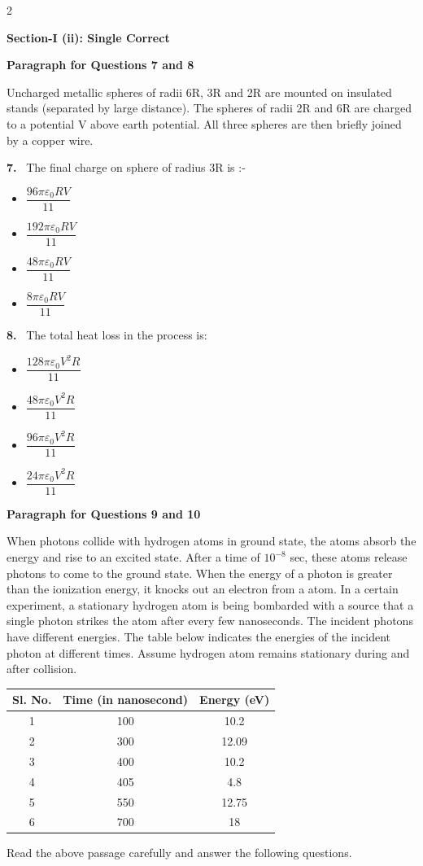 \documentclass[10pt]{extarticle}
\newcommand{\sect}[1]{\par\smallskip\noindent\textbf{#1}\par}
\newcommand{\qn}[1]{\par\smallskip\noindent\textbf{#1.}~}
\newcommand{\paraq}[2]{\par\smallskip\noindent\textbf{Paragraph for Questions #1 and #2}\par}
\newenvironment{qoptions}{\begin{itemize}[leftmargin=1.8em,itemsep=1pt,topsep=2pt,label={}]}{\end{itemize}}
\newcommand{\opt}[2]{\item[(#1)] #2}
\begin{document}
\begin{multicols}{2}
\sect{Section-I (ii): Single Correct}

\paraq{7}{8}
Uncharged metallic spheres of radii 6R, 3R and 2R are mounted on insulated stands (separated by large distance). The spheres of radii 2R and 6R are charged to a potential V above earth potential. All three spheres are then briefly joined by a copper wire.

\qn{7} The final charge on sphere of radius 3R is :-
\begin{qoptions}
\opt{A}{$\dfrac{96\pi\varepsilon_0RV}{11}$}
\opt{B}{$\dfrac{192\pi\varepsilon_0RV}{11}$}
\opt{C}{$\dfrac{48\pi\varepsilon_0RV}{11}$}
\opt{D}{$\dfrac{8\pi\varepsilon_0RV}{11}$}
\end{qoptions}

\qn{8} The total heat loss in the process is:
\begin{qoptions}
\opt{A}{$\dfrac{128\pi\varepsilon_0V^2R}{11}$}
\opt{B}{$\dfrac{48\pi\varepsilon_0V^2R}{11}$}
\opt{C}{$\dfrac{96\pi\varepsilon_0V^2R}{11}$}
\opt{D}{$\dfrac{24\pi\varepsilon_0V^2R}{11}$}
\end{qoptions}

\paraq{9}{10}
When photons collide with hydrogen atoms in ground state, the atoms absorb the energy and rise to an excited state. After a time of $10^{-8}$ sec, these atoms release photons to come to the ground state. When the energy of a photon is greater than the ionization energy, it knocks out an electron from a atom. In a certain experiment, a stationary hydrogen atom is being bombarded with a source that a single photon strikes the atom after every few nanoseconds. The incident photons have different energies. The table below indicates the energies of the incident photon at different times. Assume hydrogen atom remains stationary during and after collision.
\begin{center}
\begin{tabular}{|c|c|c|}
\hline
Sl. No. & Time (in nanosecond) & Energy (eV) \\
\hline
1 & 100 & 10.2 \\
\hline
2 & 300 & 12.09 \\
\hline
3 & 400 & 10.2 \\
\hline
4 & 405 & 4.8 \\
\hline
5 & 550 & 12.75 \\
\hline
6 & 700 & 18 \\
\hline
\end{tabular}
\end{center}
Read the above passage carefully and answer the following questions.


\end{multicols}
\end{document}
